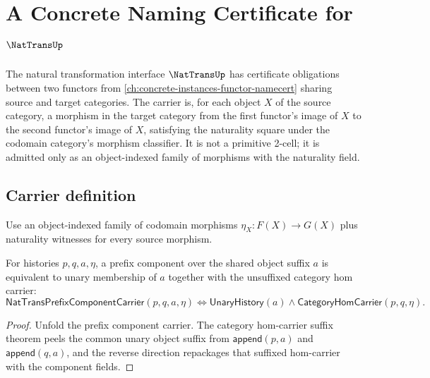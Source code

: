 \chapter{A Concrete Naming Certificate for \(\NatTransUp\)}
\label{ch:concrete-instances-nattrans-namecert}

The natural transformation interface \(\NatTransUp\) has certificate obligations between two functors from \autoref{ch:concrete-instances-functor-namecert} sharing source and target categories. The carrier is, for each object \(X\) of the source category, a morphism in the target category from the first functor's image of \(X\) to the second functor's image of \(X\), satisfying the naturality square under the codomain category's morphism classifier. It is not a primitive 2-cell; it is admitted only as an object-indexed family of morphisms with the naturality field.

\section{Carrier definition}

\begin{definition}
\label{def:nattrans-carrier}
Use an object-indexed family of codomain morphisms \(\eta_X:F(X)\to G(X)\) plus naturality witnesses for every source morphism.
\end{definition}

\begin{theorem}
\label{thm:nattrans-prefix-component-carrier-unary-object-suffix-iff}
For histories $p,q,a,\eta$, a prefix component over the shared object suffix
$a$ is equivalent to unary membership of $a$ together with the unsuffixed
category hom carrier:
$$
\mathsf{NatTransPrefixComponentCarrier}(p,q,a,\eta)
\Longleftrightarrow
\mathsf{UnaryHistory}(a)\land\mathsf{CategoryHomCarrier}(p,q,\eta).
$$
\end{theorem}
\begin{proof}
Unfold the prefix component carrier. The category hom-carrier suffix theorem
peels the common unary object suffix from
$\mathsf{append}(p,a)$ and $\mathsf{append}(q,a)$, and the reverse direction
repackages that suffixed hom-carrier with the component fields.
\end{proof}

